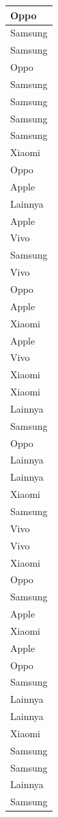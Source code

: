 \documentclass[
  letterpaper,
  DIV=11,
  numbers=noendperiod]{scrartcl}
\begin{document}
\begin{table}
\begin{tabular}[t]{l}
\hline
Oppo\\
\hline
Samsung\\
\hline
Samsung\\
\hline
Oppo\\
\hline
Samsung\\
\hline
Samsung\\
\hline
Samsung\\
\hline
Samsung\\
\hline
Xiaomi\\
\hline
Oppo\\
\hline
Apple\\
\hline
Lainnya\\
\hline
Apple\\
\hline
Vivo\\
\hline
Samsung\\
\hline
Vivo\\
\hline
Oppo\\
\hline
Apple\\
\hline
Xiaomi\\
\hline
Apple\\
\hline
Vivo\\
\hline
Xiaomi\\
\hline
Xiaomi\\
\hline
Lainnya\\
\hline
Samsung\\
\hline
Oppo\\
\hline
Lainnya\\
\hline
Lainnya\\
\hline
Xiaomi\\
\hline
Samsung\\
\hline
Vivo\\
\hline
Vivo\\
\hline
Xiaomi\\
\hline
Oppo\\
\hline
Samsung\\
\hline
Apple\\
\hline
Xiaomi\\
\hline
Apple\\
\hline
Oppo\\
\hline
Samsung\\
\hline
Lainnya\\
\hline
Lainnya\\
\hline
Xiaomi\\
\hline
Samsung\\
\hline
Samsung\\
\hline
Lainnya\\
\hline
Samsung\\

\end{tabular}
\end{table}
\end{document}
